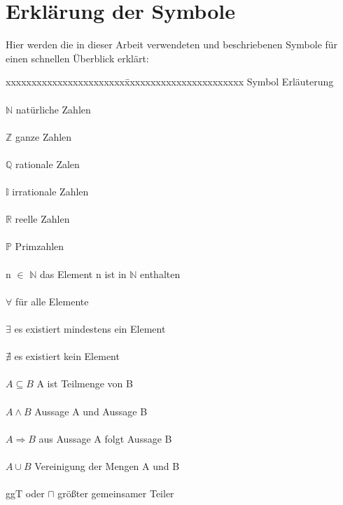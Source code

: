 \documentclass[german,12pt,a4paper]{article}
\begin{document}
\section*{Erklärung der Symbole}
Hier werden die in dieser Arbeit verwendeten und beschriebenen Symbole für einen schnellen Überblick erklärt:\\
\begin{tabbing}
xxxxxxxxxxxxxxxxxxxxxxx\=xxxxxxxxxxxxxxxxxxxxxxx\kill
\large Symbol             \> \large Erläuterung\\
\\$\mathbb{N}$            \> natürliche Zahlen\\
\\$\mathbb{Z}$            \> ganze Zahlen\\
\\$\mathbb{Q}$            \> rationale Zalen\\
\\$\mathbb{I}$            \> irrationale Zahlen\\
\\$\mathbb{R}$            \> reelle Zahlen\\
\\$\mathbb{P}$            \> Primzahlen\\
\\n $\in$ $\mathbb{N}$    \> das Element n ist in $\mathbb{N}$ enthalten\\
\\$\forall$               \> für alle Elemente\\
\\$\exists$               \> es existiert mindestens ein Element\\
\\$\nexists$              \> es existiert kein Element\\
\\$A \subseteq B$         \> A ist Teilmenge von B\\
\\$A \land B $            \> Aussage A und Aussage B\\
\\$A \Rightarrow B $      \> aus Aussage A folgt Aussage B\\
\\$A \cup B$              \> Vereinigung der Mengen A und B\\
\\ggT  oder $\sqcap$      \> größter gemeinsamer Teiler\\

\end{tabbing}
\end{document}
